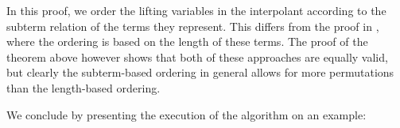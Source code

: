 \begin{comment}
		By Corollary \ref{cor:delta_entails_lifted_interpolant}, we get that $\Delta \entails \forall y_{r_1} \dots \forall y_{r_{k}}\,\lnot \lift{\Gamma}{\PI(\pi)}{y}$.
		By a similar induction argument as above, we can conclude from this that 
		$\Delta \entails \overline Q_1 z_{t_1} \dots \overline Q_n z_{t_n}\,\lnot \lft{\Delta}{x}{\lft{\Gamma}{y}{\PI(\pi)}}$ holds, where $\overline Q_i = \exists$ ($\forall$) if $Q_i = \forall$ ($\exists$).
		Therefore also
		$\Delta \entails\nolinebreak{} \lnot Q_1 z_{t_1} \dots Q_n z_{t_n}\,\lft{\Delta}{x}{\lft{\Gamma}{y}{\PI(\pi)}}$ and
		finally by Lemma \ref{lemma:lifting_order_not_relevant}, we obtain that 
		$\Delta \entails\nolinebreak{} \lnot Q_1 z_{t_1} \dots Q_n z_{t_n}\,\lft{\Gamma}{y}{\lft{\Delta}{x}{\PI(\pi)}}$.

		As it is now easy to see that $Q_1 z_{t_1} \dots Q_n z_{t_n}\,\lft{\Gamma}{y}{\lft{\Delta}{x}{\PI(\pi)}}$ contains no colored symbol, it is an interpolant.
	\end{proof}
\end{comment}

\begin{remark}
	In this proof, we order the lifting variables in the interpolant according to the subterm relation of the terms they represent.
	This differs from the proof in \cite{Huang95}, where the ordering is based on the length of these terms.
	The proof of the theorem above however shows that both of these approaches are equally valid, but clearly the subterm-based ordering in general allows for more permutations than the length-based ordering. 
\end{remark}

We conclude by presenting the execution of the algorithm on an example:

